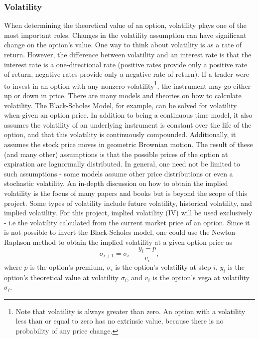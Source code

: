 \documentclass[12pt, a4paper, notitlepage]{article}
\numberwithin{equation}{subsection}
\numberwithin{figure}{subsection}
\numberwithin{table}{subsection}
\newcommand{\newpar}{\newline \newline}
\begin{document}
\subsubsection{Volatility}
When determining the theoretical value of an option, volatility plays one of the most important roles.  Changes in the volatility assumption can have significant change on the option's value.  One way to think about volatility is as a rate of return.  However, the difference between volatility and an interest rate is that the interest rate is a one-directional rate (positive rates provide only a positive rate of return, negative rates provide only a negative rate of return).  If a trader were to invest in an option with any nonzero volatility\footnote{Note that volatility is always greater than zero.  An option with a volatility less than or equal to zero has no extrinsic value, because there is no probability of any price change.}, the instrument may go either up or down in price.
\newpar
There are many models and theories on how to calculate volatility. The Black-Scholes Model, for example, can be solved for volatility when given an option price.  In addition to being a continuous time model, it also assumes the volatility of an underlying instrument is constant over the life of the option, and that this volatility is continuously compounded.  Additionally, it assumes the stock price moves in geometric Brownian motion.  The result of these (and many other) assumptions is that the possible prices of the option at expiration are lognormally distributed.  In general, one need not be limited to such assumptions - some models assume other price distributions or even a stochastic volatility. An in-depth discussion on how to obtain the implied volatility is the focus of many papers and books but is beyond the scope of this project.
\newpar
Some types of volatility include future volatility, historical volatility, and implied volatility.  For this project, implied volatility (IV) will be used exclusively - i.e the volatility calculated from the current market price of an option.  Since it is not possible to invert the Black-Scholes model, one could use the Newton-Raphson method to obtain the implied volatility at a given option price as
\begin{equation*}
	\sigma_{i+1} = \sigma_{i} - \frac{y_{i} - p}{v_{i}},
\end{equation*}
where $p$ is the option's premium, $\sigma_i$ is the option's volatility at step $i$, $y_{i}$ is the option's theoretical value at volatility $\sigma_i$, and $v_i$ is the option's vega at volatility $\sigma_i$.
\end{document}
